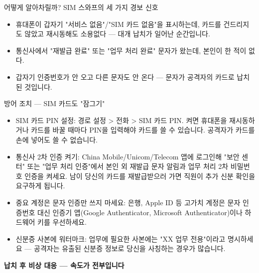 \begin{tcbinfo}{어떻게 알아차릴까? SIM 스와프의 세 가지 경보 신호}
\begin{itemize}
  \item 휴대폰이 갑자기 "서비스 없음"/"SIM 카드 없음"을 표시하는데, 카드를 건드리지도 않았고 재시동해도 소용없다 — 대개 납치가 일어난 순간입니다.
  \item 통신사에서 "재발급 완료" 또는 "업무 처리 완료" 문자가 왔는데, 본인이 한 적이 없다.
  \item 갑자기 인증번호가 안 오고 다른 문자도 안 온다 — 문자가 공격자의 카드로 납치된 것입니다.
\end{itemize}

\end{tcbinfo}

\begin{tcbwarn}{방어 조치 — SIM 카드도 "잠그기"}
\begin{itemize}
  \item SIM 카드 PIN 설정: 경로 설정 > 전화 > SIM 카드 PIN. 켜면 휴대폰을 재시동하거나 카드를 바꿀 때마다 PIN을 입력해야 카드를 쓸 수 있습니다. 공격자가 카드를 손에 넣어도 쓸 수 없습니다.
  \item 통신사 2차 인증 켜기: China Mobile/Unicom/Telecom 앱에 로그인해 "보안 센터" 또는 "업무 처리 인증"에서 본인 외 재발급 문자 알림과 업무 처리 2차 비밀번호 인증을 켜세요. 남이 당신의 카드를 재발급받으러 가면 직원이 추가 신분 확인을 요구하게 됩니다.
  \item 중요 계정은 문자 인증만 쓰지 마세요: 은행, Apple ID 등 고가치 계정은 문자 인증번호 대신 인증기 앱(Google Authenticator, Microsoft Authenticator)이나 하드웨어 키를 우선하세요.
  \item 신분증 사본에 워터마크: 업무에 필요한 사본에는 "XX 업무 전용"이라고 명시하세요 — 공격자는 유출된 신분증 정보로 당신을 사칭하는 경우가 많습니다.
\end{itemize}

\end{tcbwarn}

\textbf{납치 후 비상 대응 — 속도가 전부입니다}\par

